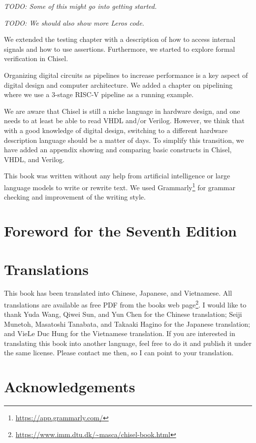 \documentclass[%
    10pt,
    headinclude, footexclude,
    openright, %
    notitlepage,
    cleardoubleempty,
    headsepline,
    pointlessnumbers,
    bibtotoc, idxtotoc,
    ]{scrbook}
\newcommand{\todo}[1]{{\emph{TODO: #1}}}
\newcommand{\myref}[2]{\href{#1}{#2}}
\renewcommand{\myref}[2]{{#2}{\footnote{\url{#1}}}}
\begin{document}
\todo{Some of this might go into getting started.}


\todo{We should also show more Leros code.}

We extended the testing chapter with a description of how to access internal signals and
how to use assertions. Furthermore, we started to explore formal verification in Chisel.

Organizing digital circuits as pipelines to increase performance is a key aspect of digital design
and computer architecture.
We added a chapter on pipelining where we use a 3-stage RISC-V pipeline as a running example.

We are aware that Chisel is still a niche language in hardware design, and one needs to
at least be able to read VHDL and/or Verilog. However, we think that with a good knowledge
of digital design, switching to a different hardware description language should be a matter of days.
To simplify this transition, we have added an appendix showing and comparing basic constructs
in Chisel, VHDL, and Verilog.

This book was written without any help from artificial intelligence or large language models
to write or rewrite text. We used Grammarly\footnote{\url{https://app.grammarly.com/}}
for grammar checking and improvement of the writing style.

\section*{Foreword for the Seventh Edition}

\section*{Translations}

This book has been translated into Chinese, Japanese, and Vietnamese. All translations are available as free PDF
from the books \myref{https://www.imm.dtu.dk/~masca/chisel-book.html}{web page}.
I would like to thank Yuda Wang, Qiwei Sun, and Yun Chen for the Chinese translation;
Seiji Munetoh, Masatoshi Tanabata, and Takaaki Hagino for the Japanese translation;
and VieLe Duc Hung for the Vietnamese translation.
If you are interested in translating this book into another language, feel free to do it and
publish it under the same license. Please contact me then, so I can point to your translation.


\section*{Acknowledgements}
\end{document}
